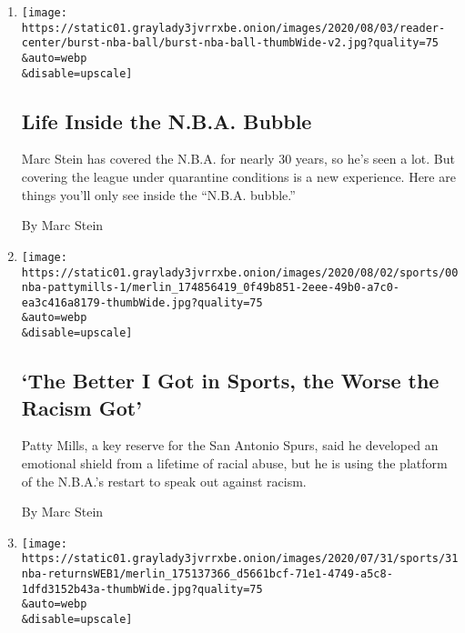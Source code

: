 \begin{enumerate}
\def\labelenumi{\arabic{enumi}.}
\item
  \href{/interactive/2020/08/04/sports/nba-bubble-coronavirus.html}{}

  \texttt{[image: https://static01.graylady3jvrrxbe.onion/images/2020/08/03/reader-center/burst-nba-ball/burst-nba-ball-thumbWide-v2.jpg?quality=75\\\&auto=webp\\\&disable=upscale]}

  \hypertarget{life-inside-the-nba-bubble}{%
  \subsection{Life Inside the N.B.A.
  Bubble}\label{life-inside-the-nba-bubble}}

  Marc Stein has covered the N.B.A. for nearly 30 years, so he's seen a
  lot. But covering the league under quarantine conditions is a new
  experience. Here are things you'll only see inside the ``N.B.A.
  bubble.''

  By Marc Stein
\item
  \href{/2020/07/31/sports/basketball/spurs-patty-mills.html}{}

  \texttt{[image: https://static01.graylady3jvrrxbe.onion/images/2020/08/02/sports/00nba-pattymills-1/merlin\_174856419\_0f49b851-2eee-49b0-a7c0-ea3c416a8179-thumbWide.jpg?quality=75\\\&auto=webp\\\&disable=upscale]}

  \hypertarget{the-better-i-got-in-sports-the-worse-the-racism-got}{%
  \subsection{`The Better I Got in Sports, the Worse the Racism
  Got'}\label{the-better-i-got-in-sports-the-worse-the-racism-got}}

  Patty Mills, a key reserve for the San Antonio Spurs, said he
  developed an emotional shield from a lifetime of racial abuse, but he
  is using the platform of the N.B.A.'s restart to speak out against
  racism.

  By Marc Stein
\item
  \href{/2020/07/31/sports/basketball/nba-opening-night.html}{}

  \texttt{[image: https://static01.graylady3jvrrxbe.onion/images/2020/07/31/sports/31nba-returnsWEB1/merlin\_175137366\_d5661bcf-71e1-4749-a5c8-1dfd3152b43a-thumbWide.jpg?quality=75\\\&auto=webp\\\&disable=upscale]}

  \hypertarget{a-momentous-first-night-back-for-the-nba}{%
}
\end{enumerate}
